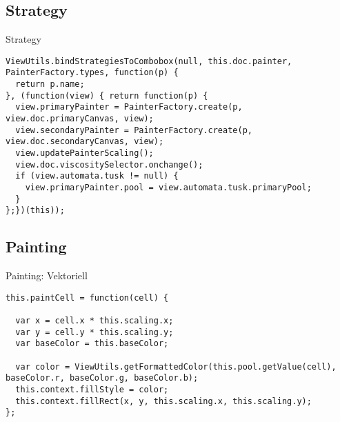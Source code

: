 \documentclass{beamer}
\begin{document}
\subsection{Strategy}

\begin{frame}[fragile]{Strategy}
\begin{lstlisting}
ViewUtils.bindStrategiesToCombobox(null, this.doc.painter, PainterFactory.types, function(p) {
  return p.name;
}, (function(view) { return function(p) {
  view.primaryPainter = PainterFactory.create(p, view.doc.primaryCanvas, view);
  view.secondaryPainter = PainterFactory.create(p, view.doc.secondaryCanvas, view);
  view.updatePainterScaling();
  view.doc.viscositySelector.onchange();
  if (view.automata.tusk != null) {
    view.primaryPainter.pool = view.automata.tusk.primaryPool;
  }
};})(this));	
\end{lstlisting}
\end{frame}

\subsection{Painting}

\begin{frame}[fragile]{Painting: Vektoriell}
\begin{lstlisting}
this.paintCell = function(cell) {
		
  var x = cell.x * this.scaling.x;
  var y = cell.y * this.scaling.y;
  var baseColor = this.baseColor;

  var color = ViewUtils.getFormattedColor(this.pool.getValue(cell), baseColor.r, baseColor.g, baseColor.b);
  this.context.fillStyle = color;
  this.context.fillRect(x, y, this.scaling.x, this.scaling.y);
};
\end{lstlisting}
\end{frame}
\end{document}
